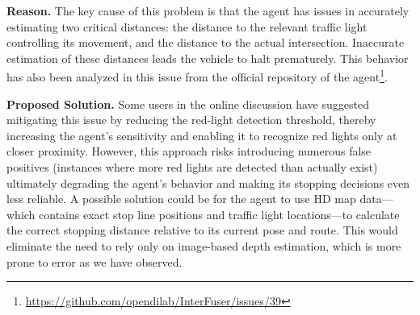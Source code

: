 \noindent\textbf{Reason.} The key cause of this problem is that the agent has issues in accurately estimating two critical distances: the distance to the relevant traffic light controlling its movement, and the distance to the actual intersection. Inaccurate estimation of these distances leads the vehicle to halt prematurely. This behavior has also been analyzed in this issue from the official repository of the agent\footnote{\url{https://github.com/opendilab/InterFuser/issues/39}}.

\noindent\textbf{Proposed Solution.} Some users in the online discussion have suggested mitigating this issue by reducing the red-light detection threshold, thereby increasing the agent’s sensitivity and enabling it to recognize red lights only at closer proximity. However, this approach risks introducing numerous false positives (instances where more red lights are detected than actually exist) ultimately degrading the agent’s behavior and making its stopping decisions even less reliable.
A possible solution could be for the agent to use HD map data—which contains exact stop line positions and traffic light locations—to calculate the correct stopping distance relative to its current pose and route. This would eliminate the need to rely only on image-based depth estimation, which is more prone to error as we have observed.

